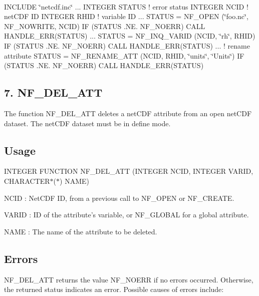  

I\+N\+C\+L\+U\+DE \char`\"{}netcdf.\+inc\char`\"{} ... I\+N\+T\+E\+G\+ER S\+T\+A\+T\+US ! error status I\+N\+T\+E\+G\+ER N\+C\+ID ! net\+C\+DF ID I\+N\+T\+E\+G\+ER R\+H\+ID ! variable ID ... S\+T\+A\+T\+US = N\+F\+\_\+\+O\+P\+EN (\char`\"{}foo.\+nc\char`\"{}, N\+F\+\_\+\+N\+O\+W\+R\+I\+TE, N\+C\+ID) IF (S\+T\+A\+T\+US .NE. N\+F\+\_\+\+N\+O\+E\+RR) C\+A\+LL H\+A\+N\+D\+L\+E\+\_\+\+E\+R\+R(\+S\+T\+A\+T\+U\+S) ... S\+T\+A\+T\+US = N\+F\+\_\+\+I\+N\+Q\+\_\+\+V\+A\+R\+ID (N\+C\+ID, \char`\"{}rh\char`\"{}, R\+H\+ID) IF (S\+T\+A\+T\+US .NE. N\+F\+\_\+\+N\+O\+E\+RR) C\+A\+LL H\+A\+N\+D\+L\+E\+\_\+\+E\+R\+R(\+S\+T\+A\+T\+U\+S) ... ! rename attribute S\+T\+A\+T\+US = N\+F\+\_\+\+R\+E\+N\+A\+M\+E\+\_\+\+A\+TT (N\+C\+ID, R\+H\+ID, \char`\"{}units\char`\"{}, \char`\"{}\+Units\char`\"{}) IF (S\+T\+A\+T\+US .NE. N\+F\+\_\+\+N\+O\+E\+RR) C\+A\+LL H\+A\+N\+D\+L\+E\+\_\+\+E\+R\+R(\+S\+T\+A\+T\+U\+S)

\subsection*{7. N\+F\+\_\+\+D\+E\+L\+\_\+\+A\+TT }

The function N\+F\+\_\+\+D\+E\+L\+\_\+\+A\+TT deletes a net\+C\+DF attribute from an open net\+C\+DF dataset. The net\+C\+DF dataset must be in define mode.

\subsection*{Usage }

I\+N\+T\+E\+G\+ER F\+U\+N\+C\+T\+I\+ON N\+F\+\_\+\+D\+E\+L\+\_\+\+A\+TT (I\+N\+T\+E\+G\+ER N\+C\+ID, I\+N\+T\+E\+G\+ER V\+A\+R\+ID, C\+H\+A\+R\+A\+C\+T\+E\+R$\ast$($\ast$) N\+A\+ME)

{\ttfamily N\+C\+ID} \+: Net\+C\+DF ID, from a previous call to N\+F\+\_\+\+O\+P\+EN or N\+F\+\_\+\+C\+R\+E\+A\+TE.

{\ttfamily V\+A\+R\+ID} \+: ID of the attribute’s variable, or N\+F\+\_\+\+G\+L\+O\+B\+AL for a global attribute.

{\ttfamily N\+A\+ME} \+: The name of the attribute to be deleted.

\subsection*{Errors }

N\+F\+\_\+\+D\+E\+L\+\_\+\+A\+TT returns the value N\+F\+\_\+\+N\+O\+E\+RR if no errors occurred. Otherwise, the returned status indicates an error. Possible causes of errors include\+:


